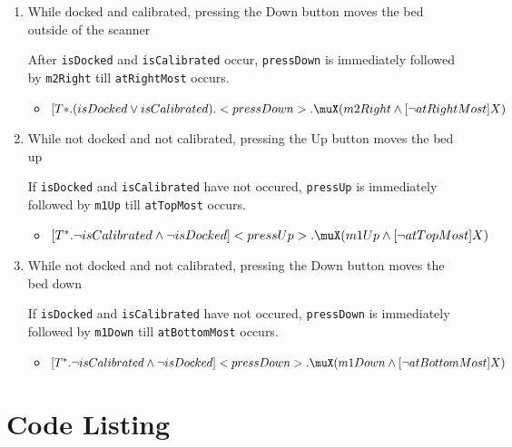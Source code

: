 \documentclass{article}
\begin{document}
\begin{enumerate}
    \item While docked and calibrated, pressing the Down button moves the bed outside of the scanner
    
    After \texttt{isDocked} and \texttt{isCalibrated} occur, \texttt{pressDown} is immediately followed by \texttt{m2Right} till \texttt{atRightMost} occurs.
    
    \begin{itemize}
        \item [\textendash]$[T {\ast}.(isDocked \vee isCalibrated).<pressDown>.\muX(m2Right \wedge [\neg atRightMost]X)$
    \end{itemize}

    \item While not docked and not calibrated, pressing the Up button moves the bed up
        
    If \texttt{isDocked} and \texttt{isCalibrated} have not occured, \texttt{pressUp} is immediately followed by \texttt{m1Up} till \texttt{atTopMost} occurs.
    
    \begin{itemize}
        \item [\textendash] $[T ^{\ast}.\neg isCalibrated \wedge \neg isDocked] <pressUp>.\muX(m1Up \wedge [\neg atTopMost]X)$
    \end{itemize}
    
    \item While not docked and not calibrated, pressing the Down button moves the bed down
    
    If \texttt{isDocked} and \texttt{isCalibrated} have not occured, \texttt{pressDown} is immediately followed by \texttt{m1Down} till \texttt{atBottomMost} occurs.
    
    \begin{itemize}
        \item [\textendash] $[T ^{\ast}.\neg isCalibrated \wedge \neg isDocked] <pressDown>.\muX(m1Down \wedge [\neg atBottomMost]X)$
    \end{itemize}
\end{enumerate}

\section{Code Listing}


\newpage
\printbibliography
\end{document}
